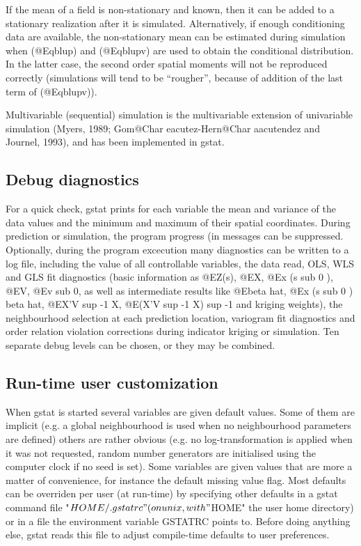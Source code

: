 \documentclass{article}
\begin{document}
If the mean of a field is non-stationary and known, then it can be added
to a stationary realization after it is simulated. Alternatively, if
enough conditioning data are available, the non-stationary mean can be
estimated during simulation when (@Eqblup) and (@Eqblupv) are used to
obtain the conditional distribution. In the latter case, the second
order spatial moments will not be reproduced correctly (simulations will
tend to be ``rougher'', because of addition of the last term of
(@Eqblupv)). 

Multivariable (sequential) simulation is the multivariable extension of
univariable simulation (Myers, 1989; Gom{@Char eacute}z-Hern{@Char
aacute}ndez and Journel, 1993), and has been implemented in gstat.

\subsection{Debug diagnostics}
For a quick check, gstat prints for each variable the mean and variance
of the data values and the minimum and maximum of their spatial
coordinates. During prediction or simulation, the program progress (in
messages can be suppressed. Optionally, during the program excecution
many diagnostics can be written to a log file, including the value of
all controllable variables, the data read, OLS, WLS and GLS fit
diagnostics (basic information as @E{Z(s)}, @E{X}, @E{x (s sub 0 )},
@E{V}, @E{v sub 0}, as well as intermediate results like @E{beta hat},
@E{x (s sub 0 ) beta hat}, @E{X'V sup -1 X}, @E{(X'V sup -1 X) sup -1}
and kriging weights), the neighbourhood selection at each prediction
location, variogram fit diagnostics and order relation violation
corrections during indicator kriging or simulation. Ten separate debug
levels can be chosen, or they may be combined.

\subsection{Run-time user customization}
When gstat is started several variables are given default values. Some
of them are implicit (e.g. a global neighbourhood is used when no
neighbourhood parameters are defined) others are rather obvious (e.g. no
log-transformation is applied when it was not requested, random number
generators are initialised using the computer clock if no seed is set).
Some variables are given values that are more a matter of convenience,
for instance the default missing value flag. Most defaults can be
overriden per user (at run-time) by specifying other defaults in a gstat
command file "$HOME/.gstatrc" (on unix, with "$HOME" the user home
directory) or in a file the environment variable GSTATRC points to.
Before doing anything else, gstat reads this file to adjust compile-time
defaults to user preferences.
\end{document}
